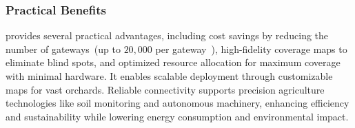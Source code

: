 \subsubsection{Practical Benefits}  
\ourSystem provides several practical advantages, including cost savings by reducing the number of gateways~(up to $20,000$ per gateway~\cite{cell_tower_cost}), high-fidelity coverage maps to eliminate blind spots, and optimized resource allocation for maximum coverage with minimal hardware.  
It enables scalable deployment through customizable maps for vast orchards.
Reliable connectivity supports precision agriculture technologies like soil monitoring and autonomous machinery, enhancing efficiency and sustainability while lowering energy consumption and environmental impact.




